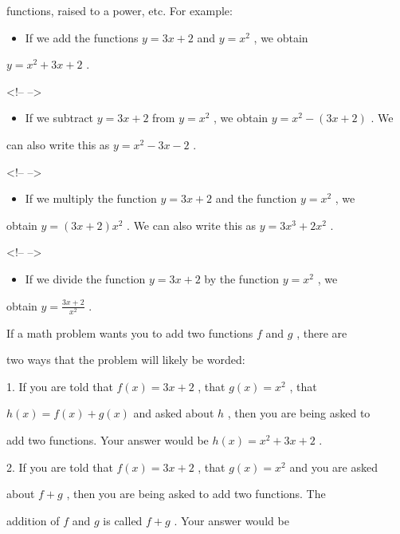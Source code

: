 functions, raised to a power, etc. For example:



\begin{itemize}
    \item If we add the functions $y=3x+2$ and $y=x^2$ , we obtain
\end{itemize}
    $y=x^2+3x+2$ .



<!-- -->



\begin{itemize}
    \item If we subtract $y=3x+2$ from $y=x^2$ , we obtain $y=x^2-(3x+2)$ . We
\end{itemize}
    can also write this as $y=x^2-3x-2$ .



<!-- -->



\begin{itemize}
    \item If we multiply the function $y=3x+2$ and the function $y=x^2$ , we
\end{itemize}
    obtain $y=(3x+2)x^2$ . We can also write this as $y=3x^3+2x^2$ .



<!-- -->



\begin{itemize}
    \item If we divide the function $y=3x+2$ by the function $y=x^2$ , we
\end{itemize}
    obtain $y=\frac{3x+2}{x^2}$ .



If a math problem wants you to add two functions $f$ and $g$ , there are

two ways that the problem will likely be worded:



1.  If you are told that $f(x)=3x+2$ , that $g(x)=x^2$ , that

    $h(x)=f(x)+g(x)$ and asked about $h$ , then you are being asked to

    add two functions. Your answer would be $h(x)=x^2+3x+2$ .

2.  If you are told that $f(x)=3x+2$ , that $g(x)=x^2$ and you are asked

    about $f+g$ , then you are being asked to add two functions. The

    addition of $f$ and $g$ is called $f+g$ . Your answer would be

